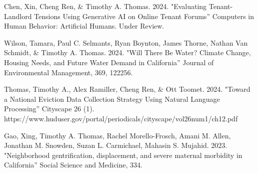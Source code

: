 



\begin{cvparagraph}

Chen, Xin, Cheng Ren, \& Timothy A. Thomas. 2024. "Evaluating Tenant-Landlord Tensions Using Generative AI on Online Tenant Forums” Computers in Human Behavior: Artificial Humans. Under Review.
\end{cvparagraph}

\begin{cvparagraph}

Wilson, Tamara, Paul C. Selmants, Ryan Boynton, James Thorne, Nathan Van Schmidt, \& Timothy A. Thomas. 2024. "Will There Be Water? Climate Change, Housing Needs, and Future Water Demand in California” Journal of Environmental Management, 369, 122256.
\end{cvparagraph}

\begin{cvparagraph}

Thomas, Timothy A., Alex Ramiller, Cheng Ren, \& Ott Toomet. 2024. "Toward a National Eviction Data Collection Strategy Using Natural Language Processing” Cityscape 26 (1). https://www.huduser.gov/portal/periodicals/cityscape/vol26num1/ch12.pdf
\end{cvparagraph}

\begin{cvparagraph}

Gao, Xing, Timothy A. Thomas, Rachel Morello-Frosch, Amani M. Allen, Jonathan M. Snowden, Suzan L. Carmichael, Mahasin S. Mujahid.  
2023. "Neighborhood gentrification, displacement, and severe maternal morbidity in California” Social Science and Medicine, 334.
\end{cvparagraph}

